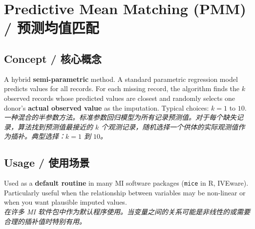 \documentclass[9pt, a4paper]{article}
\begin{document}
\section{Predictive Mean Matching (PMM) / 预测均值匹配}

\subsection{Concept / 核心概念}
\begin{tcolorbox}[defbox]
    A hybrid \textbf{semi-parametric} method. A standard parametric regression model predicts values for all records. For each missing record, the algorithm finds the $k$ observed records whose predicted values are closest and randomly selects one donor's \textbf{actual observed value} as the imputation. Typical choices: $k = 1$ to $10$.\\
    \textit{一种混合的半参数方法。标准参数回归模型为所有记录预测值。对于每个缺失记录，算法找到预测值最接近的 $k$ 个观测记录，随机选择一个供体的实际观测值作为插补。典型选择：$k = 1$ 到 $10$。}
\end{tcolorbox}

\subsection{Usage / 使用场景}
Used as a \textbf{default routine} in many MI software packages (\texttt{mice} in R, IVEware). Particularly useful when the relationship between variables may be non-linear or when you want plausible imputed values.\\
\textit{在许多 MI 软件包中作为默认程序使用。当变量之间的关系可能是非线性的或需要合理的插补值时特别有用。}
\end{document}
